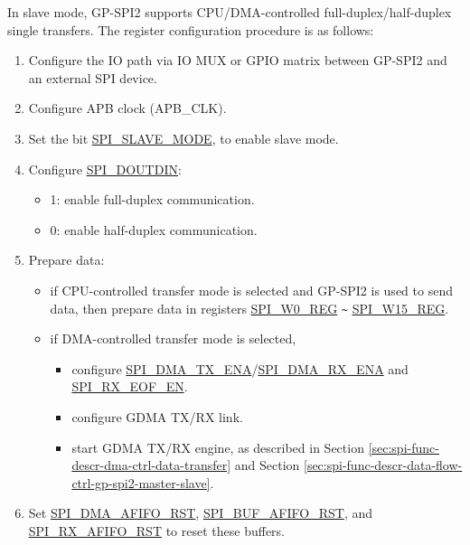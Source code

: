 \documentclass[main\_\_EN.tex]{subfiles}
\begin{document}
In slave mode, GP-SPI2 supports CPU/DMA-controlled full-duplex/half-duplex single transfers. The register configuration procedure is as follows:
\begin{enumerate}
    \item Configure the IO path via IO MUX or GPIO matrix between GP-SPI2 and an external SPI device.

    \item Configure APB clock (APB\_CLK).

    \item Set the bit \hyperref[fielddesc:SPISLAVEMODE]{SPI\_SLAVE\_MODE}, to enable slave mode.

    \item Configure \hyperref[fielddesc:SPIDOUTDIN]{SPI\_DOUTDIN}:
    \begin{itemize}
        \item 1: enable full-duplex communication.
        \item 0: enable half-duplex communication.
    \end{itemize}

    \item Prepare data:
    \begin{itemize}
        \item if CPU-controlled transfer mode is selected and GP-SPI2 is used to send data, then prepare data in registers \hyperref[regdesc:SPIW0REG]{SPI\_W0\_REG} \verb+~+ \hyperref[regdesc:SPIW15REG]{SPI\_W15\_REG}.
        \item if DMA-controlled transfer mode is selected,
        \begin{itemize}
            \item configure \hyperref[fielddesc:SPIDMATXENA]{SPI\_DMA\_TX\_ENA}/\hyperref[fielddesc:SPIDMARXENA]{SPI\_DMA\_RX\_ENA} and \hyperref[fielddesc:SPIRXEOFEN]{SPI\_RX\_EOF\_EN}.
            \item configure GDMA TX/RX link.
            \item start GDMA TX/RX engine, as described in Section \ref{sec:spi-func-descr-dma-ctrl-data-transfer} and Section \ref{sec:spi-func-descr-data-flow-ctrl-gp-spi2-master-slave}.
        \end{itemize}
    \end{itemize}

    \item Set \hyperref[fielddesc:SPIDMAAFIFORST]{SPI\_DMA\_AFIFO\_RST}, \hyperref[fielddesc:SPIBUFAFIFORST]{SPI\_BUF\_AFIFO\_RST}, and \hyperref[fielddesc:SPIRXAFIFORST]{SPI\_RX\_AFIFO\_RST} to reset these buffers.


\end{enumerate}
\end{document}
